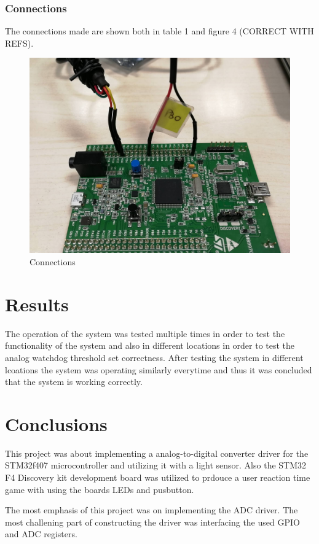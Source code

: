 \subsubsection{Connections}
The connections made are shown both in table 1 and figure 4 (CORRECT WITH REFS). 

\begin{figure}[htbp]
  \centering
     \includegraphics[width=1\textwidth]{./figures/connections.jpg}
  \caption{Connections}
  \label{fig:connections}
\end{figure}

\section{Results}
The operation of the system was tested multiple times in order to test the functionality of the system and also in different locations in order to test the analog watchdog threshold set correctness. After testing the system in different lcoations the system was operating similarly everytime and thus it was concluded that the system is working correctly.

\section{Conclusions}
This project was about implementing a analog-to-digital converter driver for the STM32f407 microcontroller and utilizing it with a light sensor. Also the STM32 F4 Discovery kit development board was utilized to prdouce a user reaction time game with using the boards LEDs and pusbutton.\\
\par
The most emphasis of this project was on implementing the ADC driver. The most challening part of constructing the driver was interfacing the used GPIO and ADC registers.
